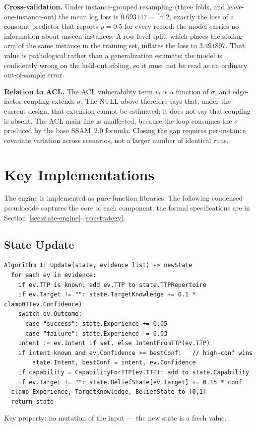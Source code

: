 \documentclass[preprints,article,accept,oneauthor]{Definitions/mdpi}
\begin{document}
\textbf{Cross-validation.} Under instance-grouped resampling (three folds,
and leave-one-instance-out) the mean log loss is $0.693147=\ln 2$, exactly
the loss of a constant predictor that reports $p=0.5$ for every record; the
model carries no information about unseen instances. A row-level split,
which places the sibling arm of the same instance in the training set,
inflates the loss to $3.491897$. That value is pathological rather than a
generalization estimate: the model is confidently wrong on the held-out
sibling, so it must not be read as an ordinary out-of-sample error.

\textbf{Relation to ACL.} The ACL vulnerability term $v_t$ is a function of
$\sigma$, and edge-factor coupling extends $\sigma$. The NULL above
therefore says that, under the current design, that extension cannot be
estimated; it does not say that coupling is absent. The ACL main line is
unaffected, because the loop consumes the $\sigma$ produced by the base
SSAM~2.0 formula. Closing the gap requires per-instance covariate variation
across scenarios, not a larger number of identical runs.

\section{Key Implementations}
\label{sec:impl}

The engine is implemented as pure-function libraries. The following
condensed pseudocode captures the core of each component; the formal
specifications are in Section~\ref{sec:state-engine}--\ref{sec:strategy}.

\subsection{State Update}
\label{sec:impl-update}

\begin{verbatim}
Algorithm 1: Update(state, evidence list) -> newState
  for each ev in evidence:
    if ev.TTP is known: add ev.TTP to state.TTPRepertoire
    if ev.Target != "": state.TargetKnowledge += 0.1 * clamp01(ev.Confidence)
    switch ev.Outcome:
      case "success": state.Experience += 0.05
      case "failure": state.Experience -= 0.03
    intent := ev.Intent if set, else IntentFromTTP(ev.TTP)
    if intent known and ev.Confidence >= bestConf:   // high-conf wins
        state.Intent, bestConf = intent, ev.Confidence
    if capability = CapabilityForTTP(ev.TTP): add to state.Capability
    if ev.Target != "": state.BeliefState[ev.Target] += 0.15 * conf
  clamp Experience, TargetKnowledge, BeliefState to [0,1]
  return state
\end{verbatim}
Key property: no mutation of the input --- the new state is a fresh value.
\end{document}
